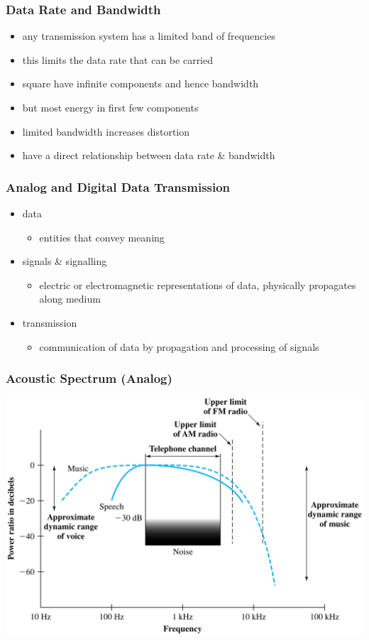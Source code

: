 \documentclass[pdflatex,compress]{beamer}
\begin{document}
\begin{frame}
	\frametitle{Data Rate and Bandwidth}
	\begin{itemize}
		\item any transmission system has a limited band of frequencies
		\item this limits the data rate that can be carried
		\item square have infinite components and hence bandwidth
		\item but most energy in first few components
		\item limited bandwidth increases distortion
		\item have a direct relationship between data rate \& bandwidth
	\end{itemize}
\end{frame}

\begin{frame}
	\frametitle{Analog and Digital Data Transmission}
	\begin{itemize}
		\item data 
		\begin{itemize}
			\item entities that convey meaning
		\end{itemize}
		\item signals \& signalling
		\begin{itemize}
			\item electric or electromagnetic representations of data, physically propagates along medium
		\end{itemize}
		\item transmission
		\begin{itemize}
			\item communication of data by propagation and processing of signals
		\end{itemize}
	\end{itemize}	
\end{frame}

\begin{frame}
	\frametitle{Acoustic Spectrum (Analog)}
	\begin{center}
		\includegraphics[height=0.9\textheight]{img/img06}
	\end{center}
\end{frame}
\end{document}
